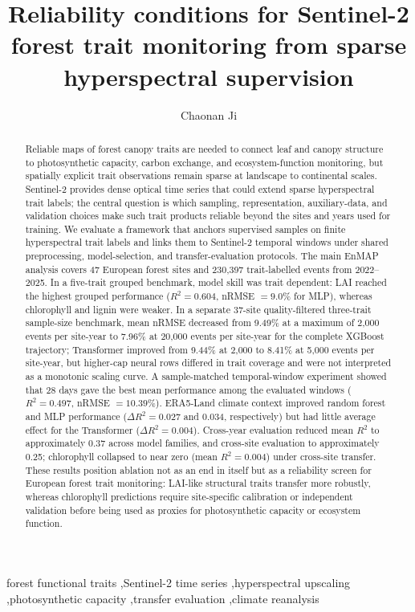 \documentclass[final,times,onecolumn, authoryear]{elsarticle}
\begin{document}
\begin{frontmatter}

\title{Reliability conditions for Sentinel-2 forest trait monitoring from sparse hyperspectral supervision}

\author{Chaonan Ji}
\address{EcoSpectra traits-model project}

\begin{abstract}
Reliable maps of forest canopy traits are needed to connect leaf and canopy structure to photosynthetic capacity, carbon exchange, and ecosystem-function monitoring, but spatially explicit trait observations remain sparse at landscape to continental scales. Sentinel-2 provides dense optical time series that could extend sparse hyperspectral trait labels; the central question is which sampling, representation, auxiliary-data, and validation choices make such trait products reliable beyond the sites and years used for training. We evaluate a framework that anchors supervised samples on finite hyperspectral trait labels and links them to Sentinel-2 temporal windows under shared preprocessing, model-selection, and transfer-evaluation protocols. The main EnMAP analysis covers 47 European forest sites and 230,397 trait-labelled events from 2022--2025. In a five-trait grouped benchmark, model skill was trait dependent: LAI reached the highest grouped performance ($R^2=0.604$, nRMSE $=9.0\%$ for MLP), whereas chlorophyll and lignin were weaker. In a separate 37-site quality-filtered three-trait sample-size benchmark, mean nRMSE decreased from 9.49\% at a maximum of 2,000 events per site-year to 7.96\% at 20,000 events per site-year for the complete XGBoost trajectory; Transformer improved from 9.44\% at 2,000 to 8.41\% at 5,000 events per site-year, but higher-cap neural rows differed in trait coverage and were not interpreted as a monotonic scaling curve. A sample-matched temporal-window experiment showed that 28 days gave the best mean performance among the evaluated windows ($R^2=0.497$, nRMSE $=10.39\%$). ERA5-Land climate context improved random forest and MLP performance ($\Delta R^2=0.027$ and 0.034, respectively) but had little average effect for the Transformer ($\Delta R^2=0.004$). Cross-year evaluation reduced mean $R^2$ to approximately 0.37 across model families, and cross-site evaluation to approximately 0.25; chlorophyll collapsed to near zero (mean $R^2=0.004$) under cross-site transfer. These results position ablation not as an end in itself but as a reliability screen for European forest trait monitoring: LAI-like structural traits transfer more robustly, whereas chlorophyll predictions require site-specific calibration or independent validation before being used as proxies for photosynthetic capacity or ecosystem function.
\end{abstract}

\begin{keyword}
forest functional traits \sep Sentinel-2 time series \sep hyperspectral upscaling \sep photosynthetic capacity \sep transfer evaluation \sep climate reanalysis
\end{keyword}
\end{frontmatter}
\end{document}
